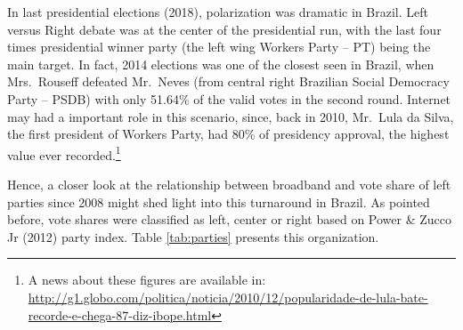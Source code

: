 \documentclass[
  12pt,
]{article}
\begin{document}
In last presidential elections (2018), polarization was dramatic in
Brazil. Left versus Right debate was at the center of the presidential
run, with the last four times presidential winner party (the left wing
Workers Party -- PT) being the main target. In fact, 2014 elections was
one of the closest seen in Brazil, when Mrs.~Rouseff defeated Mr.~Neves
(from central right Brazilian Social Democracy Party -- PSDB) with only
51.64\% of the valid votes in the second round. Internet may had a
important role in this scenario, since, back in 2010, Mr.~Lula da Silva,
the first president of Workers Party, had 80\% of presidency approval,
the highest value ever recorded.\footnote{A news about these figures are
  available in:
  \url{http://g1.globo.com/politica/noticia/2010/12/popularidade-de-lula-bate-recorde-e-chega-87-diz-ibope.html}}

Hence, a closer look at the relationship between broadband and vote
share of left parties since 2008 might shed light into this turnaround
in Brazil. As pointed before, vote shares were classified as left,
center or right based on Power \& Zucco Jr (2012) party index. Table
\ref{tab:parties} presents this organization.

\begin{table}[H]

\caption{\label{tab:parties}Party classification based on party index}
\centering
{}
\end{table}
\end{document}
